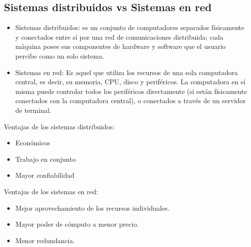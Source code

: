 \documentclass[a4paper,11pt]{article}
\begin{document}
\subsection{Sistemas distribuidos vs Sistemas en red}
\begin{itemize}
  \item  Sistemas distribuidos: es un conjunto de computadores separados físicamente y conectados entre sí por una red de comunicaciones distribuida; cada máquina posee sus componentes de hardware y software que el usuario percibe como un solo sistema.
  \item Sistemas en red: Es aquel que utiliza los recursos de una sola computadora central, es decir, su memoria, CPU, disco y periféricos. La computadora en sí misma puede controlar todos los periféricos directamente (si están físicamente conectados con la
computadora central), o conectados a través de un servidor de terminal.
\end{itemize}

Ventajas de los sistemas distribuidos:
\begin{itemize}
  \item Económicos
  \item Trabajo en conjunto
  \item Mayor confiabilidad
\end{itemize}

Ventajas de los sistemas en red:
\begin{itemize}
  \item Mejor aprovechamiento de los recursos individuales.
  \item Mayor poder de cómputo a menor precio.
  \item Menor redundancia.

\end{itemize}
\end{document}
